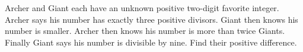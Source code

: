 Archer and Giant each have an unknown positive two-digit favorite integer. Archer says his number has exactly three positive divisors. Giant then knows his number is smaller. Archer then knows his number is more than twice Giant\textquotesingle s. Finally Giant says his number is divisible by nine. Find their positive difference.
